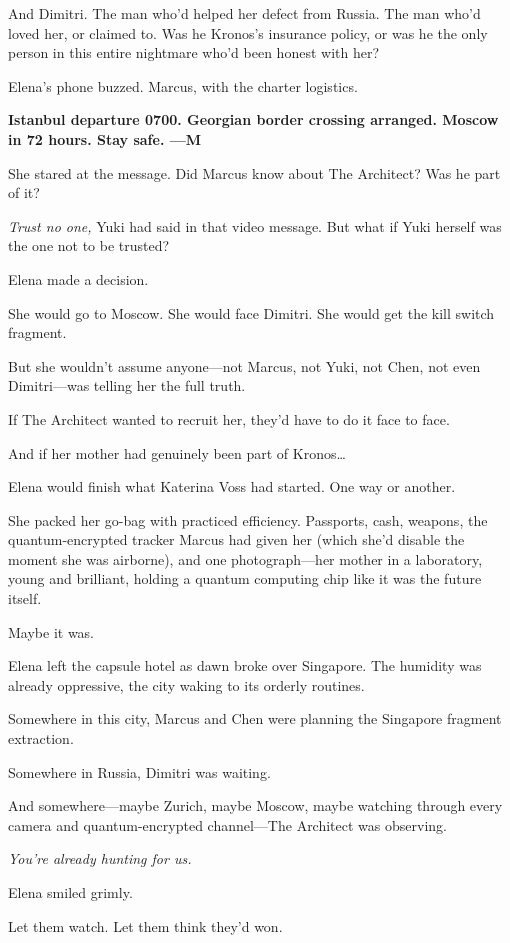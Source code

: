 \documentclass[12pt,letterpaper]{book}
\begin{document}
And Dimitri. The man who'd helped her defect from Russia. The man who'd loved her, or claimed to. Was he Kronos's insurance policy, or was he the only person in this entire nightmare who'd been honest with her?

Elena's phone buzzed. Marcus, with the charter logistics.

\textbf{Istanbul departure 0700. Georgian border crossing arranged. Moscow in 72 hours. Stay safe. ---M}

She stared at the message. Did Marcus know about The Architect? Was he part of it?

\emph{Trust no one,} Yuki had said in that video message. But what if Yuki herself was the one not to be trusted?

Elena made a decision.

She would go to Moscow. She would face Dimitri. She would get the kill switch fragment.

But she wouldn't assume anyone---not Marcus, not Yuki, not Chen, not even Dimitri---was telling her the full truth.

If The Architect wanted to recruit her, they'd have to do it face to face.

And if her mother had genuinely been part of Kronos\ldots{}

Elena would finish what Katerina Voss had started. One way or another.

She packed her go-bag with practiced efficiency. Passports, cash, weapons, the quantum-encrypted tracker Marcus had given her (which she'd disable the moment she was airborne), and one photograph---her mother in a laboratory, young and brilliant, holding a quantum computing chip like it was the future itself.

Maybe it was.

Elena left the capsule hotel as dawn broke over Singapore. The humidity was already oppressive, the city waking to its orderly routines.

Somewhere in this city, Marcus and Chen were planning the Singapore fragment extraction.

Somewhere in Russia, Dimitri was waiting.

And somewhere---maybe Zurich, maybe Moscow, maybe watching through every camera and quantum-encrypted channel---The Architect was observing.

\emph{You're already hunting for us.}

Elena smiled grimly.

Let them watch. Let them think they'd won.
\end{document}
